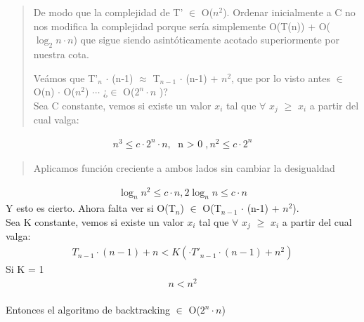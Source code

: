 \documentclass[7pt,a4paper]{article}
\begin{document}
\begin{verse}
De modo que la complejidad de T' $\in$ O($n^{2}$). Ordenar inicialmente a C no nos modifica la complejidad porque sería simplemente O(T(n)) + O($\log_{2}n \cdot n$) que sigue siendo asintóticamente acotado superiormente por nuestra cota.

Veámos que T'$_{n}$ $\cdot$ (n-1) $\approx$ T$_{n-1}$ $\cdot$ (n-1) + $n^{2}$, que por lo visto antes $\in$ O(n) $\cdot$ O($n^{2}$) $\cdots$ ¿$\in$ O($2^{n} \cdot n$ )?  \\
Sea C constante, vemos si existe un valor $x_{i}$ tal que $\forall$ $x_{j}$ $\geq$ $x_{i}$ a partir del cual valga:
\end{verse}

\begin{align}
n^{3} \leq c \cdot 2^{n} \cdot n, \text{  n $>$ 0}, n^{2} \leq c \cdot 2^{n}
\end{align}
\begin{verse}
Aplicamos función creciente a ambos lados sin cambiar la desigualdad
\end{verse}
\begin{align}
\log_{n} n^{2} \leq c \cdot n, 2 \log_{n}n \leq c \cdot n
\end{align}
Y esto es cierto. Ahora falta ver si O(T$_{n}$) $\in$ O(T$_{n-1}$ $\cdot$ (n-1) + $n^{2}$).\\
Sea K constante, vemos si existe un valor $x_{i}$ tal que $\forall$ $x_{j}$ $\geq$ $x_{i}$ a partir del cual valga:
\begin{align}
	T_{n-1} \cdot (n-1) + n < K (\cdot T'_{n-1} \cdot (n-1) + n^{2})
\end{align}
Si K = 1
\begin{align}
	 n < n^{2}
\end{align}
\\ Entonces el algoritmo de backtracking $\in$ O($2^{n} \cdot n$)
\end{document}
